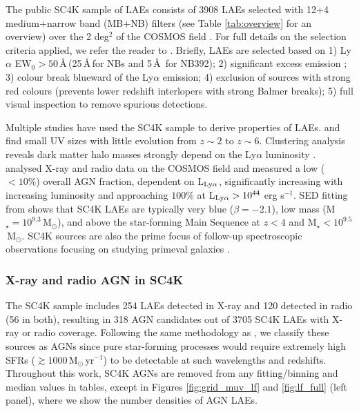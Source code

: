 \documentclass[a4paper,fleqn,usenatbib]{mnras}
\begin{document}
The public SC4K sample of LAEs \citep[Slicing COSMOS with 4k LAEs,][]{Sobral2018} consists of 3908 LAEs selected with 12+4 medium+narrow band (MB+NB) filters (see Table \ref{tab:overview} for an overview) over the 2 deg$^2$ of the COSMOS field \citep{Capak2007,Scoville2007,Taniguchi2015}. For full details on the selection criteria applied, we refer the reader to \cite{Sobral2018}. Briefly, LAEs are selected based on 1) Ly$\alpha$ EW$_0>50$\,\AA\,(25\,\AA\,for NBs and 5\,\AA\, for NB392); 2) significant excess emission \citep[$\Sigma>3$; see][]{Bunker1995}; 3) colour break blueward of the Ly$\alpha$ emission; 4) exclusion of sources with strong red colours (prevents lower redshift interlopers with strong Balmer breaks); 5) full visual inspection to remove spurious detections.

Multiple studies have used the SC4K sample to derive properties of LAEs. \cite{PaulinoAfonso2018} and \cite{Shibuya2019} find small UV sizes with little evolution from $z\sim2$ to $z\sim6$. Clustering analysis reveals dark matter halo masses strongly depend on the Ly$\alpha$ luminosity \citep[L$_{\rm Ly\alpha}$,][]{Khostovan2019}. \cite{Calhau2020} analysed X-ray and radio data on the COSMOS field and measured a low  ($<10\%$) overall AGN fraction, dependent on L$_{\rm Ly\alpha}$, significantly increasing with increasing luminosity and approaching $100\%$ at L$_{\rm Ly\alpha}>10^{44}$ erg s$^{-1}$. SED fitting from \cite{Santos2020} shows that SC4K LAEs are typically very blue ($\beta=-2.1$), low mass (M$_\star=10^{9.3}$\,M$_\odot$), and above the star-forming Main Sequence at $z<4$ and M$_\star<10^{9.5}$\,M$_\odot$. SC4K sources are also the prime focus of follow-up spectroscopic observations focusing on studying primeval galaxies \citep{Amorin2017}.

\subsubsection{X-ray and radio AGN in SC4K} \label{sec:sample_AGNs}

The SC4K sample includes 254 LAEs detected in X-ray and 120 detected in radio (56 in both), resulting in 318 AGN candidates \citep{Calhau2020} out of 3705 SC4K LAEs with X-ray or radio coverage. Following the same methodology as \cite{Santos2020}, we classify these sources as AGNs since pure star-forming processes would require extremely high SFRs ($\gtrsim1000$\,M$_\odot$\,yr$^{-1}$) to be detectable at such wavelengths and redshifts. Throughout this work, SC4K AGNs are removed from any fitting/binning and median values in tables, except in Figures \ref{fig:grid_muv_lf} and \ref{fig:lf_full} (left panel), where we show the number densities of AGN LAEs.
\end{document}
